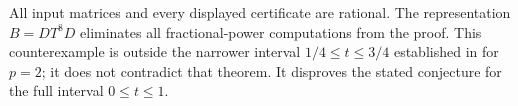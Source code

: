 \begin{remark}
All input matrices and every displayed certificate are rational. The representation $B=DT^8D$ eliminates all fractional-power computations from the proof. This counterexample is outside the narrower interval $1/4\leq t\leq3/4$ established in \cite{GAMA2021} for $p=2$; it does not contradict that theorem. It disproves the stated conjecture for the full interval $0\leq t\leq1$.
\end{remark}
